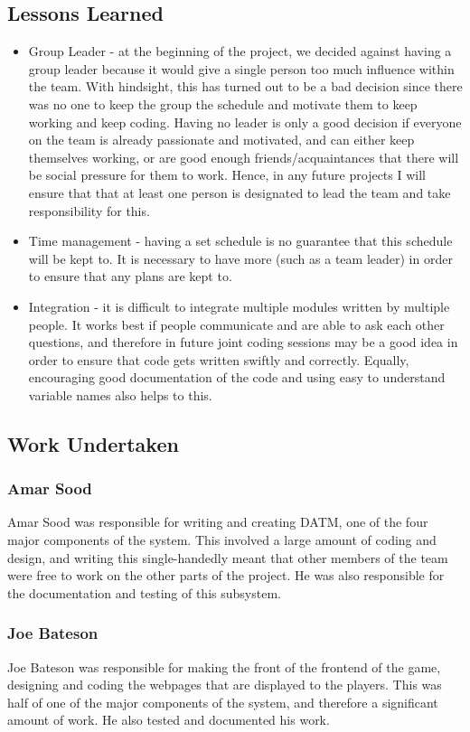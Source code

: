 \documentclass[a4paper,10pt,twoside]{article}
\begin{document}
\subsection{Lessons Learned}
\begin{itemize}
\item Group Leader - at the beginning of the project, we decided against having a group leader because it would give a single person too much influence within the team. With hindsight, this has turned out to be a bad decision since there was no one to keep the group the schedule and motivate them to keep working and keep coding. Having no leader is only a good decision if everyone on the team is already passionate and motivated, and can either keep themselves working, or are good enough friends/acquaintances that there will be social pressure for them to work. Hence, in any future projects I will ensure that that at least one person is designated to lead the team and take responsibility for this.
\item Time management - having a set schedule is no guarantee that this schedule will be kept to. It is necessary to have more (such as a team leader) in order to ensure that any plans are kept to.
\item Integration - it is difficult to integrate multiple modules written by multiple people. It works best if people communicate and are able to ask each other questions, and therefore in future joint coding sessions may be a good idea in order to ensure that code gets written swiftly and correctly. Equally, encouraging good documentation of the code and using easy to understand variable names also helps to this.
\end{itemize}

\subsection{Work Undertaken}
\subsubsection{Amar Sood}
Amar Sood was responsible for writing and creating DATM, one of the four major components of the system. This involved a large amount of coding and design, and writing this single-handedly meant that other members of the team were free to work on the other parts of the project. He was also responsible for the documentation and testing of this subsystem.
\subsubsection{Joe Bateson}
Joe Bateson was responsible for making the front of the frontend of the game, designing and coding the webpages that are displayed to the players. This was half of one of the major components of the system, and therefore a significant amount of work. He also tested and documented his work.
\end{document}

